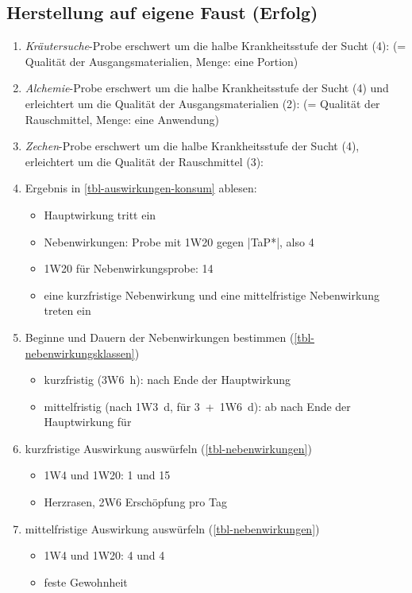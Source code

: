 \subsection{Herstellung auf eigene Faust (Erfolg)}
\begin{enumerate}
	\item \emph{Kräutersuche}-Probe erschwert um die halbe Krankheitsstufe der Sucht (4):  (= Qualität der Ausgangsmaterialien, Menge: eine Portion)
	\item \emph{Alchemie}-Probe erschwert um die halbe Krankheitsstufe der Sucht (4) und erleichtert um die Qualität der Ausgangsmaterialien (2):  (= Qualität der Rauschmittel, Menge: eine Anwendung)
	\item \emph{Zechen}-Probe erschwert um die halbe Krankheitsstufe der Sucht (4), erleichtert um die Qualität der Rauschmittel (3): 
	\item Ergebnis in \vref{tbl-auswirkungen-konsum} ablesen:
	\begin{itemize}
		\item Hauptwirkung tritt ein
		\item Nebenwirkungen: Probe mit 1W20 gegen |TaP*|, also 4
		\item 1W20 für Nebenwirkungsprobe: 14
		\item eine kurzfristige Nebenwirkung und eine mittelfristige Nebenwirkung treten ein
	\end{itemize}
	\item Beginne und Dauern der Nebenwirkungen bestimmen (\vref{tbl-nebenwirkungsklassen})
	\begin{itemize}
		\item kurzfristig (3W6~h):  nach Ende der Hauptwirkung
		\item mittelfristig (nach 1W3~d, für 3~+~1W6~d): ab  nach Ende der Hauptwirkung für 
	\end{itemize}
	\item kurzfristige Auswirkung auswürfeln (\vref{tbl-nebenwirkungen})
	\begin{itemize}
		\item 1W4 und 1W20: 1 und 15
		\item Herzrasen, 2W6 Erschöpfung pro Tag
	\end{itemize}
	\item mittelfristige Auswirkung auswürfeln (\vref{tbl-nebenwirkungen})
	\begin{itemize}
		\item 1W4 und 1W20: 4 und 4
		\item feste Gewohnheit
	\end{itemize}
\end{enumerate}

